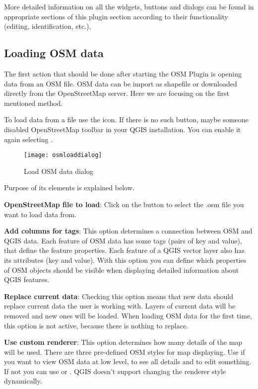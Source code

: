 More detailed information on all the widgets, buttons and dialogs can be
found in appropriate sections of this plugin section according to their
functionality (editing, identification, etc.).

\subsection{Loading OSM data}

The first action that should be done after starting the OSM Plugin is
opening data from an OSM file. OSM data can be import as shapefile or
downloaded directly from the OpenStreetMap server. Here we are focusing
on the first mentioned method.

To load data from a file use the 
icon. If there is no such button, maybe someone disabled OpenStreetMap
toolbar in your QGIS installation. You can enable it again selecting
 \arrow {} \arrow {}.

\begin{figure}[ht]
   \centering
   \texttt{[image: osmloaddialog]}
   \caption{Load OSM data dialog \nixcaption}\label{fig:osmload}
\end{figure}

Purpose of its elements is explained below.

\begin{description}
\item \textbf{OpenStreetMap file to load}: Click on the button to select
the .osm file you want to load data from.
\item \textbf{Add columns for tags}: This option determines a connection
between OSM and QGIS data. Each feature of OSM data has
some tags (pairs of key and value), that define the feature properties.
Each feature of a QGIS vector layer also has its attributes (key and value).
With this option you can define which properties of OSM objects should
be visible when displaying detailed information about QGIS features.
\item \textbf{Replace current data}: Checking this option means that
new data should replace current data the user is working with. Layers of
current data will be removed and new ones will be loaded. When loading
OSM data for the first time, this option is not active, because there is
nothing to replace.
\item \textbf{Use custom renderer}: This option determines how many details
of the map will be used. There are three pre-defined OSM styles for map
displaying. Use  if you want to view OSM data at low level,
to see all details and to edit something. If not you can use
 or . QGIS \CURRENT doesn't
support changing the renderer style dynamically.
\end{description}

